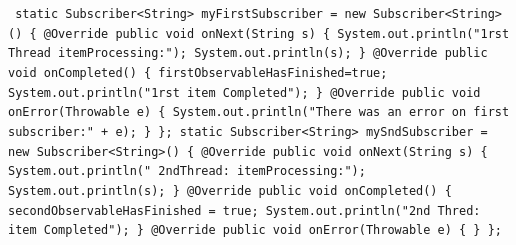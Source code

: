 \documentclass[12pt,oneside,a4paper,bibtotoc,liststotoc]{scrreprt}
\begin{document}
\texttt{\newline
static Subscriber<String> myFirstSubscriber = new Subscriber<String>() \{\newline
\newline
       @Override\newline
       public void onNext(String s) \{\newline
           System.out.println("1rst Thread itemProcessing:");\newline
           System.out.println(s);\newline
       \}\newline
\newline
       @Override\newline
       public void onCompleted() \{\newline
           firstObservableHasFinished=true;\newline
           System.out.println("1rst item Completed");\newline
       \}\newline
\newline
       @Override\newline
       public void onError(Throwable e) \{\newline
           System.out.println("There was an error on first subscriber:" + e);\newline
       \}\newline
   \};\newline
\newline
   static Subscriber<String> mySndSubscriber = new Subscriber<String>() \{\newline
       @Override\newline
       public void onNext(String s) \{\newline
           System.out.println("  2ndThread: itemProcessing:");\newline
           System.out.println(s);\newline
       \}\newline
\newline
       @Override\newline
       public void onCompleted() \{\newline
           secondObservableHasFinished = true;\newline
           System.out.println("2nd Thred: item Completed");\newline
       \}\newline
\newline
       @Override\newline
       public void onError(Throwable e) \{\newline
       \}\newline
   \};\newline
}
\end{document}
